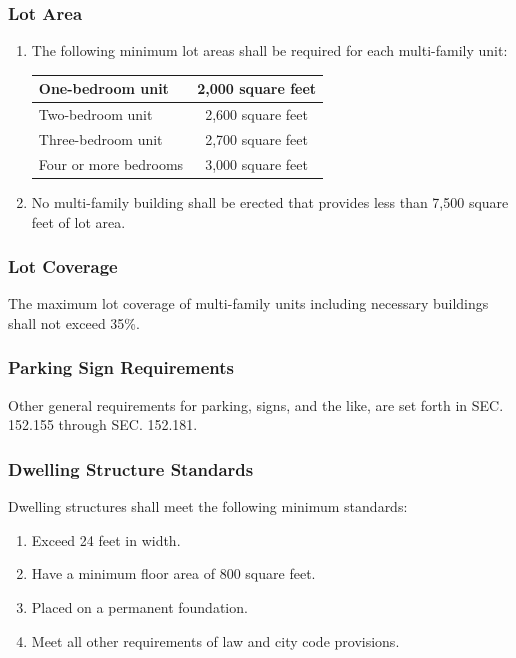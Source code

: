 \subsubsection{Lot Area}
\begin{enumerate}[{\indent}a)]
    \item The following minimum lot areas shall be required for each multi-family unit:
        \begin{center}
        \begin{tabular}{|l|c|}
            \hline
            One-bedroom unit & 2,000 square feet\\
            \hline
            Two-bedroom unit & 2,600 square feet\\
            \hline
            Three-bedroom unit & 2,700 square feet\\
            \hline
            Four or more bedrooms & 3,000 square feet\\
            \hline
        \end{tabular}
        \end{center}
    \item No multi-family building shall be erected that provides less than 7,500 square feet of lot area.
\end{enumerate}
\subsubsection{Lot Coverage}
The maximum lot coverage of multi-family units including necessary buildings shall not exceed 35\%.
\subsubsection{Parking Sign Requirements}
Other general requirements for parking, signs, and the like, are set forth in SEC. 152.155 through SEC. 152.181.
\subsubsection{Dwelling Structure Standards}
Dwelling structures shall meet the following minimum standards:
\begin{enumerate}[{\indent}a)]
    \item Exceed 24 feet in width.
    \item Have a minimum floor area of 800 square feet.
    \item Placed on a permanent foundation.
    \item Meet all other requirements of law and city code provisions.
\end{enumerate}

